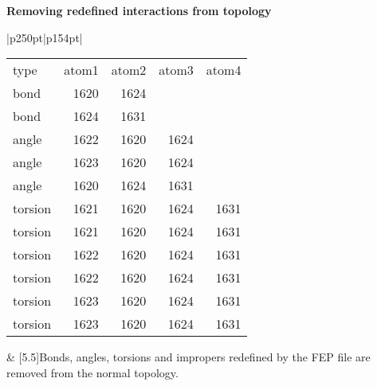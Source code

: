 \documentclass[a4paper,10pt]{article}
\begin{document}
\normalsize
\textbf{Removing redefined interactions from topology}
\tiny
\vspace{-1\baselineskip}
\begin{longtable}{|p{250pt}|p{154pt}|}
\hline \begin{tabular}{lrrrr}type & atom1 & atom2 & atom3 & atom4\\bond & 1620 & 1624&&\\bond & 1624 & 1631&&\\angle & 1622 & 1620 & 1624&\\angle & 1623 & 1620 & 1624&\\angle & 1620 & 1624 & 1631&\\torsion & 1621 & 1620 & 1624 & 1631\\torsion & 1621 & 1620 & 1624 & 1631\\torsion & 1622 & 1620 & 1624 & 1631\\torsion & 1622 & 1620 & 1624 & 1631\\torsion & 1623 & 1620 & 1624 & 1631\\torsion & 1623 & 1620 & 1624 & 1631\end{tabular} & [5.5\baselineskip]{Bonds, angles, torsions and impropers redefined by the FEP file are removed from the normal topology.}\\
\hline \end{longtable}
\end{document}
